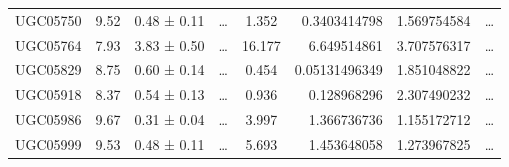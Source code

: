 \documentclass[reprint,%
 amsmath,amssymb,
 aps,
]{revtex4-1}
\begin{document}
\begin{table}[]
\begin{tabular}{cccccrrc}
\rowcolor[HTML]{F3F3F3} 
UGC05750             & 9.52                      & 0.48 ± 0.11           & …                      & 1.352                                                        & 0.3403414798                                                          & 1.569754584                                                           & …                                                             \\
\rowcolor[HTML]{F3F3F3} 
UGC05764             & 7.93                      & 3.83 ± 0.50           & …                      & 16.177                                                       & 6.649514861                                                           & 3.707576317                                                           & …                                                             \\
\rowcolor[HTML]{F3F3F3} 
UGC05829             & 8.75                      & 0.60 ± 0.14           & …                      & 0.454                                                        & 0.05131496349                                                         & 1.851048822                                                           & …                                                             \\
\rowcolor[HTML]{F3F3F3} 
UGC05918             & 8.37                      & 0.54 ± 0.13           & …                      & 0.936                                                        & 0.128968296                                                           & 2.307490232                                                           & …                                                             \\
\rowcolor[HTML]{F3F3F3} 
UGC05986             & 9.67                      & 0.31 ± 0.04           & …                      & 3.997                                                        & 1.366736736                                                           & 1.155172712                                                           & …                                                             \\
\rowcolor[HTML]{F3F3F3} 
UGC05999             & 9.53                      & 0.48 ± 0.11           & …                      & 5.693                                                        & 1.453648058                                                           & 1.273967825                                                           & …                                                             \\

\end{tabular}
\end{table}
\end{document}
